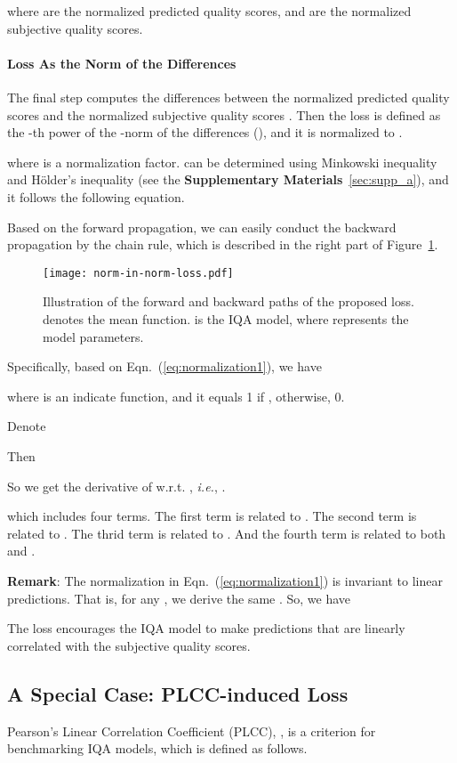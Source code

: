 \documentclass[sigconf]{acmart}
\begin{document}
where  are the normalized predicted quality scores, and  are the normalized subjective quality scores.

\paragraph{Loss As the Norm of the Differences}
The final step computes the differences  between the normalized predicted quality scores  and the normalized subjective quality scores .
Then the loss  is defined as the -th power of the -norm of the differences (), and it is normalized to .

where  is a normalization factor.  can be determined using Minkowski inequality and H\"older's inequality (see the \textbf{Supplementary Materials}~\ref{sec:supp_a}), and it follows the following equation.



Based on the forward propagation, we can easily conduct the backward propagation by the chain rule, which is described in the right part of Figure~\ref{fig:norm-in-norm loss}.

\begin{figure}[!t]
    \centering
    \texttt{[image: norm-in-norm-loss.pdf]}
    \caption{Illustration of the forward and backward paths of the proposed loss.  denotes the mean function.  is the IQA model, where  represents the model parameters.}
    \label{fig:norm-in-norm loss}
\end{figure}

Specifically, based on Eqn.~(\ref{eq:normalization1}), we have

where  is an indicate function, and it equals 1 if , otherwise, 0.

Denote


Then



So we get the derivative of  w.r.t. , \textit{i.e.}, .

which includes four terms. 
The first term is related to .
The second term is related to .
The thrid term is related to .
And the fourth term is related to both  and .

\noindent\textbf{Remark}: The normalization in Eqn.~(\ref{eq:normalization1}) is invariant to linear predictions. 
That is, for any , we derive the same .
So, we have

The loss encourages the IQA model to make predictions that are linearly correlated with the subjective quality scores.

\subsection{A Special Case: PLCC-induced Loss}
Pearson's Linear Correlation Coefficient (PLCC), , is a criterion for benchmarking IQA models, which is defined as follows.
\end{document}
